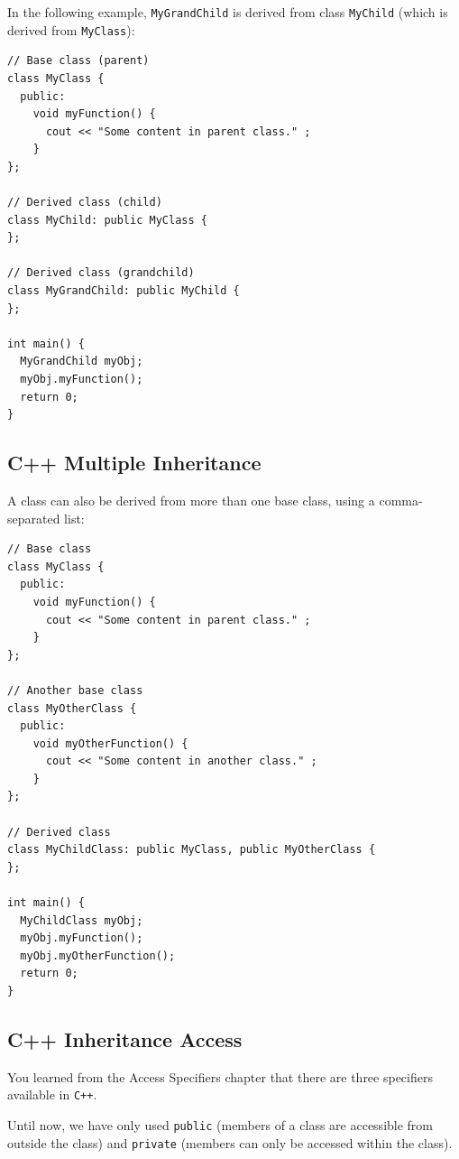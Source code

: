 \documentclass[../basic_programs.tex]{subfiles}
\begin{document}
  \begin{exa}
    In the following example, \lstinline|MyGrandChild| is derived from class \lstinline|MyChild| (which is derived from \lstinline|MyClass|):

    \begin{lstlisting}[caption={caption},label=DescriptiveLabel]
// Base class (parent)
class MyClass {
  public:
    void myFunction() {
      cout << "Some content in parent class." ;
    }
};

// Derived class (child)
class MyChild: public MyClass {
};

// Derived class (grandchild)
class MyGrandChild: public MyChild {
};

int main() {
  MyGrandChild myObj;
  myObj.myFunction();
  return 0;
}
    \end{lstlisting}
  \end{exa}

  \subsection{C++ Multiple Inheritance}

  A class can also be derived from more than one base class, using a comma-separated list:

  \begin{lstlisting}[caption={caption},label=DescriptiveLabel]
// Base class
class MyClass {
  public:
    void myFunction() {
      cout << "Some content in parent class." ;
    }
};

// Another base class
class MyOtherClass {
  public:
    void myOtherFunction() {
      cout << "Some content in another class." ;
    }
};

// Derived class
class MyChildClass: public MyClass, public MyOtherClass {
};

int main() {
  MyChildClass myObj;
  myObj.myFunction();
  myObj.myOtherFunction();
  return 0;
}
  \end{lstlisting}

  \subsection{C++ Inheritance Access}

  You learned from the Access Specifiers chapter that there are three specifiers available in \lstinline|C++|.

  Until now, we have only used \lstinline|public| (members of a class are accessible from outside the class) and \lstinline|private| (members can only be accessed within the class).
\end{document}
